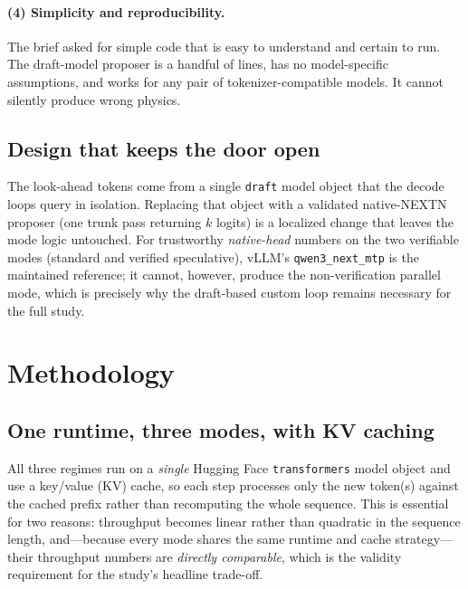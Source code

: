 \documentclass[11pt]{article}
\begin{document}
\paragraph{(4) Simplicity and reproducibility.}
The brief asked for simple code that is easy to understand and certain to run.
The draft-model proposer is a handful of lines, has no model-specific assumptions,
and works for any pair of tokenizer-compatible models. It cannot silently
produce wrong physics.

\subsection{Design that keeps the door open}
The look-ahead tokens come from a single \texttt{draft} model object that the
decode loops query in isolation. Replacing that object with a validated
native-NEXTN proposer (one trunk pass returning $k$ logits) is a localized
change that leaves the mode logic untouched. For trustworthy \emph{native-head}
numbers on
the two verifiable modes (standard and verified speculative), vLLM's
\texttt{qwen3\_next\_mtp} is the maintained reference; it cannot, however,
produce the non-verification parallel mode, which is precisely why the
draft-based custom loop remains necessary for the full study.

\section{Methodology}
\subsection{One runtime, three modes, with KV caching}
\label{sec:onert}
All three regimes run on a \emph{single} Hugging Face \texttt{transformers} model
object and use a key/value (KV) cache, so each step processes only the new
token(s) against the cached prefix rather than recomputing the whole sequence.
This is essential for two reasons: throughput becomes linear rather than
quadratic in the sequence length, and---because every mode shares the same
runtime and cache strategy---their throughput numbers are \emph{directly
comparable}, which is the validity requirement for the study's headline
trade-off.
\end{document}
